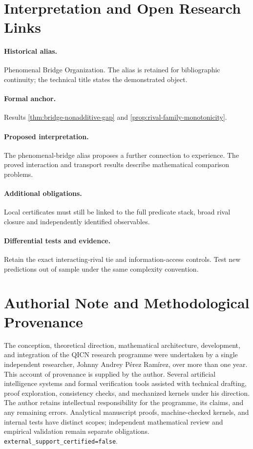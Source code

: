 \documentclass[11pt,a4paper]{article}
\theoremstyle{definition}
\begin{document}
\section{Interpretation and Open Research Links}\label{sec:interpretation-open-links}
\paragraph{Historical alias.} Phenomenal Bridge Organization. The alias is retained for bibliographic continuity; the technical title states the demonstrated object.

\paragraph{Formal anchor.} Results \ref{thm:bridge-nonadditive-gap} and \ref{prop:rival-family-monotonicity}.

\paragraph{Proposed interpretation.} The phenomenal-bridge alias proposes a further connection to experience. The proved interaction and transport results describe mathematical comparison problems.

\paragraph{Additional obligations.} Local certificates must still be linked to the full predicate stack, broad rival closure and independently identified observables.

\paragraph{Differential tests and evidence.} Retain the exact interacting-rival tie and information-access controls. Test new predictions out of sample under the same complexity convention.



\printbibliography

\section*{Authorial Note and Methodological Provenance}
The conception, theoretical direction, mathematical architecture, development,
and integration of the QICN research programme were undertaken by a single
independent researcher, Johnny Andrey P\'erez Ram\'irez, over more than one year.
This account of provenance is supplied by the author. Several artificial
intelligence systems and formal verification tools assisted with technical
drafting, proof exploration, consistency checks, and mechanized kernels under
his direction. The author retains intellectual responsibility for the
programme, its claims, and any remaining errors. Analytical manuscript proofs,
machine-checked kernels, and internal tests have distinct scopes; independent
mathematical review and empirical validation remain separate obligations.
\texttt{external\_support\_certified=false}.
\end{document}
